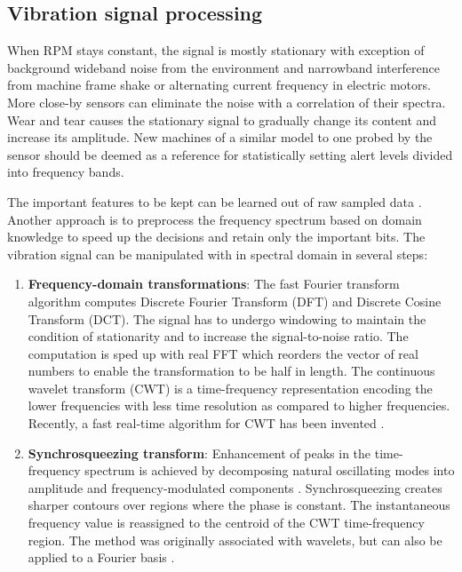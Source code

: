 \documentclass[11pt, a4paper, english]{article}
\begin{document}
\begin{refsection}
\subsection{Vibration signal processing}
When RPM stays constant, the signal is mostly stationary with exception of background wideband noise from the environment and narrowband interference from machine frame shake or alternating current frequency in electric motors. More close-by sensors can eliminate the noise with a correlation of their spectra. Wear and tear causes the stationary signal to gradually change its content and increase its amplitude. New machines of a similar model to one probed by the sensor should be deemed as a reference for statistically setting alert levels divided into frequency bands.

The important features to be kept can be learned out of raw sampled data \cite{luo_early_2019}. Another approach is to preprocess the frequency spectrum based on domain knowledge to speed up the decisions and retain only the important bits. The vibration signal can be manipulated with in spectral domain in several steps:

\begin{enumerate}
	\item \textbf{Frequency-domain transformations}: The fast Fourier transform algorithm computes Discrete Fourier Transform (DFT) and Discrete Cosine Transform (DCT). The signal has to undergo windowing to maintain the condition of stationarity and to increase the signal-to-noise ratio. The computation is sped up with real FFT which reorders the vector of real numbers to enable the transformation to be half in length. The continuous wavelet transform (CWT) is a time-frequency representation encoding the lower frequencies with less time resolution as compared to higher frequencies. Recently, a fast real-time algorithm for CWT has been invented \cite{arts_fast_2022}.
	
	\item \textbf{Synchrosqueezing transform}: Enhancement of peaks in the time-frequency spectrum is achieved by decomposing natural oscillating modes into amplitude and frequency-modulated components \cite{meignen_synchrosqueezing_2019}. Synchrosqueezing creates sharper contours over regions where the phase is constant. The instantaneous frequency value is reassigned to the centroid of the CWT time-frequency region. The method was originally associated with wavelets, but can also be applied to a Fourier basis \cite{yu_concentrated_2020}.
	

\end{enumerate}
\end{refsection}
\end{document}
